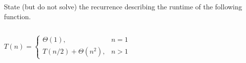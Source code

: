 \begin{prob}
    State (but do not solve) the recurrence describing the runtime of the following function.

    \inputminted{python}{./code.py}

    \begin{soln}
    $
        T(n) = \begin{cases}
            \Theta(1), & n = 1\\
            T(n/2) + \Theta(n^2)%
            , & n > 1
        \end{cases}
    $
        
    \end{soln}

\end{prob}
